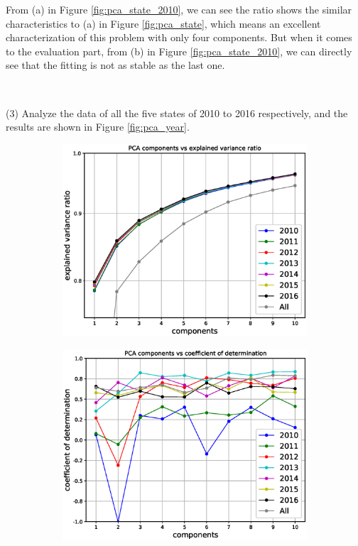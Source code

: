 \documentclass{mcmthesis}
\begin{document}
From (a) in Figure \ref{fig:pca_state_2010}, we can see the ratio shows the similar characteristics to (a) in Figure \ref{fig:pca_state}, which means an excellent characterization of this problem with only four components. But when it comes to the evaluation part, from (b) in Figure \ref{fig:pca_state_2010}, we can directly see that the fitting is not as stable as the last one.

~\smallskip

(3) Analyze the data of all the five states of 2010 to 2016 respectively, and the results are shown in Figure \ref{fig:pca_year}.
    \begin{figure}[H]
    \centering
    \begin{subfigure}[b]{0.48\textwidth}
        \includegraphics[width=\textwidth]{../figure/pca_year_ratio.eps}
        \label{fig:pca_year_ratio}
    \end{subfigure}\hfill
    \begin{subfigure}[b]{0.48\textwidth}
        \includegraphics[width=\textwidth]{../figure/pca_year_score.eps}

\end{subfigure}
\end{figure}
\end{document}
